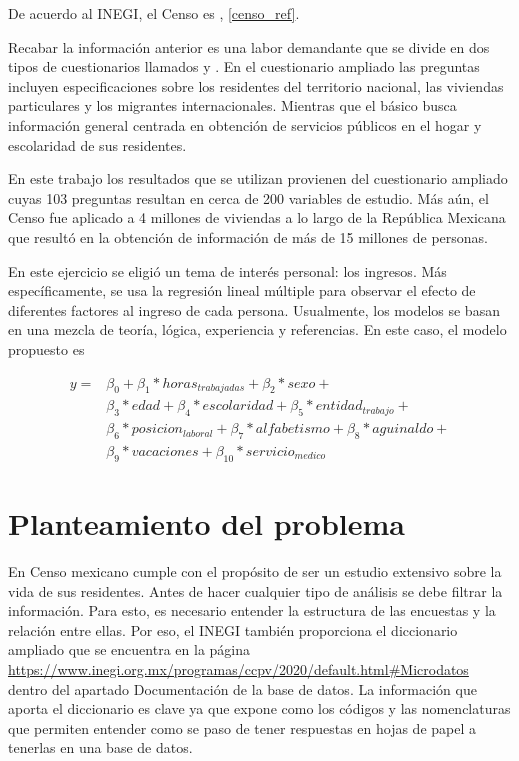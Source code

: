 De acuerdo al INEGI, el Censo es , \ref{censo_ref}. 

Recabar la información anterior es una labor demandante que se divide en dos tipos de cuestionarios llamados  y . En el cuestionario ampliado las preguntas incluyen especificaciones sobre los residentes del territorio nacional, las viviendas particulares y los migrantes internacionales. Mientras que el básico busca información general centrada en obtención de servicios públicos en el hogar y escolaridad de sus residentes. 

En este trabajo los resultados que se utilizan provienen del cuestionario ampliado cuyas 103 preguntas resultan en cerca de 200 variables de estudio. Más aún, el Censo fue aplicado a 4 millones de viviendas a lo largo de la República Mexicana que resultó en la obtención de información de más de 15 millones de personas.

En este ejercicio se eligió un tema de interés personal: los ingresos. Más específicamente, se usa la regresión lineal múltiple para observar el efecto de diferentes factores al ingreso de cada persona. Usualmente, los modelos se basan en una mezcla de teoría, lógica, experiencia y referencias. En este caso, el modelo propuesto es 

\begin{equation} \label{modelo_final}
    \begin{aligned}
    	y =& \beta_0 + \beta_1*horas_{trabajadas} + \beta_2*sexo + \\
    	&\beta_3*edad + \beta_4*escolaridad + \beta_5*entidad_{trabajo} + \\ &\beta_6*posicion_{laboral} + \beta_7*alfabetismo + \beta_8*aguinaldo + \\ &\beta_9*vacaciones + \beta_{10}*servicio_{medico}
    \end{aligned}
\end{equation}


\section{Planteamiento del problema}
En Censo mexicano cumple con el propósito de ser un estudio extensivo sobre la vida de sus residentes. Antes de hacer cualquier tipo de análisis se debe filtrar la información. Para esto, es necesario entender la estructura de las encuestas y la relación entre ellas. Por eso, el INEGI también proporciona el diccionario ampliado que se encuentra en la página \url{https://www.inegi.org.mx/programas/ccpv/2020/default.html#Microdatos} dentro del apartado \textsf{Documentación de la base de datos}. La información que aporta el diccionario es clave ya que expone como los códigos y las nomenclaturas que permiten entender como se paso de tener respuestas en hojas de papel a tenerlas en una base de datos.

